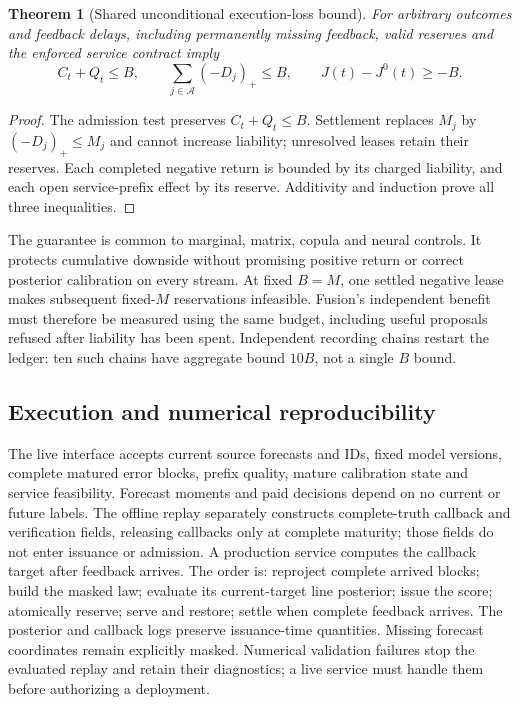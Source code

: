 \documentclass[10pt]{article}
\newtheorem{theorem}{Theorem}
\begin{document}
\begin{theorem}[Shared unconditional execution-loss bound]
\label{thm:unconditional-loss-budget}
For arbitrary outcomes and feedback delays, including permanently missing
feedback, valid reserves and the enforced service contract imply
\begin{equation}
 C_t+Q_t\leq B,\qquad
 \sum_{j\in\mathcal A}(-D_j)_+\leq B,\qquad
 J(t)-J^0(t)\geq-B.
 \label{eq:pathwise-loss-budget}
\end{equation}
\end{theorem}
\begin{proof}
The admission test preserves $C_t+Q_t\leq B$. Settlement replaces $M_j$
by $(-D_j)_+\leq M_j$ and cannot increase liability; unresolved leases
retain their reserves. Each completed negative return is bounded by its
charged liability, and each open service-prefix effect by its reserve.
Additivity and induction prove all three inequalities.
\end{proof}
The guarantee is common to marginal, matrix, copula and neural controls.
It protects cumulative downside without promising positive return or
correct posterior calibration on every stream. At fixed $B=M$, one settled
negative lease makes subsequent fixed-$M$ reservations infeasible. Fusion's
independent benefit must therefore be measured using the same budget,
including useful proposals refused after liability has been spent.
Independent recording chains restart the ledger: ten such chains have
aggregate bound $10B$, not a single $B$ bound.

\subsection{Execution and numerical reproducibility}
The live interface accepts current source forecasts and IDs, fixed model
versions, complete matured error blocks, prefix quality, mature calibration
state and service feasibility. Forecast moments and paid decisions depend
on no current or future labels. The offline replay separately constructs
complete-truth callback and verification fields, releasing callbacks only
at complete maturity; those fields do not enter issuance or admission.
A production service computes the callback target after feedback arrives.
The order is: reproject complete arrived blocks; build the masked law;
evaluate its current-target line posterior; issue the score; atomically
reserve; serve and restore; settle when complete feedback arrives.
The posterior and callback logs preserve issuance-time quantities.
Missing forecast coordinates remain explicitly masked. Numerical
validation failures stop the evaluated replay and retain their diagnostics;
a live service must handle them before authorizing a deployment.
\end{document}
